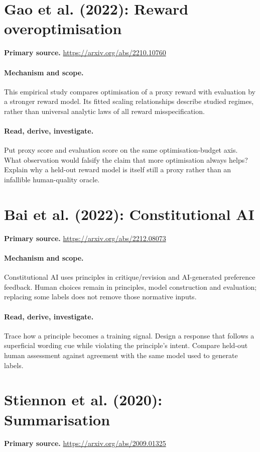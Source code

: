 \documentclass[11pt]{scrartcl}
\begin{document}
\section{Gao et al. (2022): Reward overoptimisation}
\noindent\textbf{Primary source.} \url{https://arxiv.org/abs/2210.10760}

\paragraph{Mechanism and scope.} This empirical study compares optimisation of a proxy reward with evaluation by a stronger reward model. Its fitted scaling relationships describe studied regimes, rather than universal analytic laws of all reward misspecification.

\paragraph{Read, derive, investigate.} Put proxy score and evaluation score on the same optimisation-budget axis. What observation would falsify the claim that more optimisation always helps? Explain why a held-out reward model is itself still a proxy rather than an infallible human-quality oracle.

\section{Bai et al. (2022): Constitutional AI}
\noindent\textbf{Primary source.} \url{https://arxiv.org/abs/2212.08073}

\paragraph{Mechanism and scope.} Constitutional AI uses principles in critique/revision and AI-generated preference feedback. Human choices remain in principles, model construction and evaluation; replacing some labels does not remove those normative inputs.

\paragraph{Read, derive, investigate.} Trace how a principle becomes a training signal. Design a response that follows a superficial wording cue while violating the principle's intent. Compare held-out human assessment against agreement with the same model used to generate labels.

\section{Stiennon et al. (2020): Summarisation}
\noindent\textbf{Primary source.} \url{https://arxiv.org/abs/2009.01325}
\end{document}
